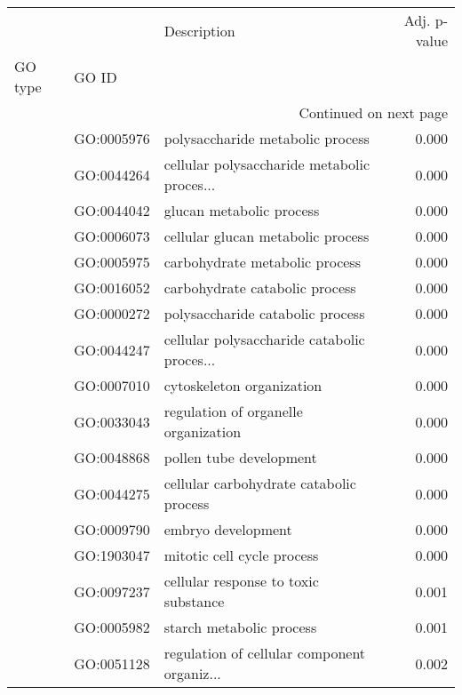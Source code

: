 \begin{longtable}{lllr}
\toprule
   &            &                                  Description &  Adj. p-value \\
GO type & GO ID &                                              &               \\
\midrule
\endhead
\midrule
\multicolumn{4}{r}{{Continued on next page}} \\
\midrule
\endfoot

\bottomrule
\endlastfoot
\multirow{196}{*}{BP} & GO:0005976 &             polysaccharide metabolic process &         0.000 \\
   & GO:0044264 &  cellular polysaccharide metabolic proces... &         0.000 \\
   & GO:0044042 &                     glucan metabolic process &         0.000 \\
   & GO:0006073 &            cellular glucan metabolic process &         0.000 \\
   & GO:0005975 &               carbohydrate metabolic process &         0.000 \\
   & GO:0016052 &               carbohydrate catabolic process &         0.000 \\
   & GO:0000272 &             polysaccharide catabolic process &         0.000 \\
   & GO:0044247 &  cellular polysaccharide catabolic proces... &         0.000 \\
   & GO:0007010 &                    cytoskeleton organization &         0.000 \\
   & GO:0033043 &         regulation of organelle organization &         0.000 \\
   & GO:0048868 &                      pollen tube development &         0.000 \\
   & GO:0044275 &      cellular carbohydrate catabolic process &         0.000 \\
   & GO:0009790 &                           embryo development &         0.000 \\
   & GO:1903047 &                   mitotic cell cycle process &         0.000 \\
   & GO:0097237 &         cellular response to toxic substance &         0.001 \\
   & GO:0005982 &                     starch metabolic process &         0.001 \\
   & GO:0051128 &  regulation of cellular component organiz... &         0.002 \\

\end{longtable}
